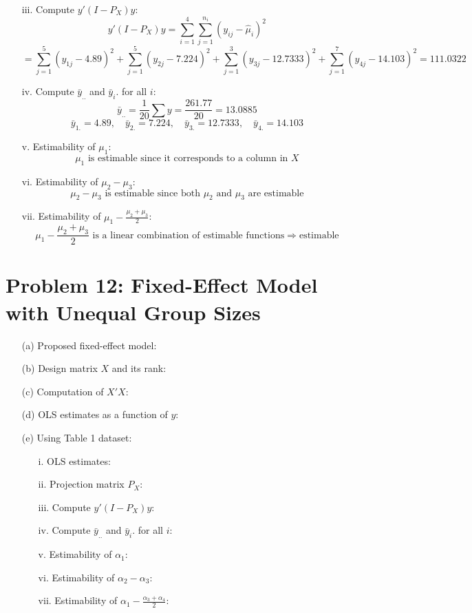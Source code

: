 \documentclass[10pt, oneside]{article}
\begin{document}
\begin{itemize}
\begin{itemize}
		\item[iii.] Compute $y'(I - P_X)y$:
        \[
    y'(I - P_X)y = \sum_{i=1}^{4} \sum_{j=1}^{n_i} (y_{ij} - \hat{\mu}_i)^2
  \]
  \[
    = \sum_{j=1}^{5} (y_{1j} - 4.89)^2 + \sum_{j=1}^{5} (y_{2j} - 7.224)^2 + \sum_{j=1}^{3} (y_{3j} - 12.7333)^2 + \sum_{j=1}^{7} (y_{4j} - 14.103)^2 = 111.0322
  \]
		\item[iv.] Compute $\bar{y}_{..}$ and $\bar{y}_i.$ for all $i$:
        \[
    \bar{y}_{..} = \frac{1}{20} \sum y = \frac{261.77}{20} = 13.0885
  \]
  \[
    \bar{y}_{1.} = 4.89, \quad \bar{y}_{2.} = 7.224, \quad \bar{y}_{3.} = 12.7333, \quad \bar{y}_{4.} = 14.103
  \]
		\item[v.] Estimability of $\mu_1$:
        \[
    \mu_1 \text{ is estimable since it corresponds to a column in } X
  \]
		\item[vi.] Estimability of $\mu_2 - \mu_3$:
        \[
    \mu_2 - \mu_3 \text{ is estimable since both } \mu_2 \text{ and } \mu_3 \text{ are estimable}
  \]
		\item[vii.] Estimability of $\mu_1 - \frac{\mu_2 + \mu_3}{2}$:
        \[
    \mu_1 - \frac{\mu_2 + \mu_3}{2} \text{ is a linear combination of estimable functions} \Rightarrow \text{estimable}
  \]
	\end{itemize}
\end{itemize}

\section*{Problem 12: Fixed-Effect Model with Unequal Group Sizes}
\begin{itemize}
	\item[(a)] Proposed fixed-effect model:
	\item[(b)] Design matrix $X$ and its rank:
	\item[(c)] Computation of $X'X$:
	\item[(d)] OLS estimates as a function of $y$:
	\item[(e)] Using Table 1 dataset:
	\begin{itemize}
		\item[i.] OLS estimates:
		\item[ii.] Projection matrix $P_X$:
		\item[iii.] Compute $y'(I - P_X)y$:
		\item[iv.] Compute $\bar{y}_{..}$ and $\bar{y}_i.$ for all $i$:
		\item[v.] Estimability of $\alpha_1$:
		\item[vi.] Estimability of $\alpha_2 - \alpha_3$:
		\item[vii.] Estimability of $\alpha_1 - \frac{\alpha_3 + \alpha_4}{2}$:
	\end{itemize}
\end{itemize}
\end{document}
